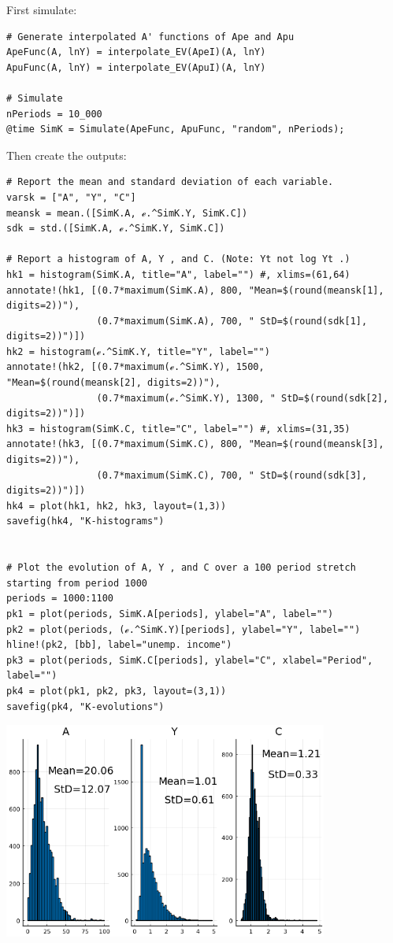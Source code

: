 \documentclass[12pt]{article}
\begin{document}
First simulate:
\begin{lstlisting}[language=JuliaLocal, style=julia]
# Generate interpolated A' functions of Ape and Apu
ApeFunc(A, lnY) = interpolate_EV(ApeI)(A, lnY)
ApuFunc(A, lnY) = interpolate_EV(ApuI)(A, lnY)

# Simulate
nPeriods = 10_000
@time SimK = Simulate(ApeFunc, ApuFunc, "random", nPeriods);
\end{lstlisting}

Then create the outputs:
\begin{lstlisting}[language=JuliaLocal, style=julia]
# Report the mean and standard deviation of each variable. 
varsk = ["A", "Y", "C"]
meansk = mean.([SimK.A, ℯ.^SimK.Y, SimK.C])
sdk = std.([SimK.A, ℯ.^SimK.Y, SimK.C])

# Report a histogram of A, Y , and C. (Note: Yt not log Yt .) 
hk1 = histogram(SimK.A, title="A", label="") #, xlims=(61,64)
annotate!(hk1, [(0.7*maximum(SimK.A), 800, "Mean=$(round(meansk[1], digits=2))"),
                (0.7*maximum(SimK.A), 700, " StD=$(round(sdk[1], digits=2))")])
hk2 = histogram(ℯ.^SimK.Y, title="Y", label="")
annotate!(hk2, [(0.7*maximum(ℯ.^SimK.Y), 1500, "Mean=$(round(meansk[2], digits=2))"),
                (0.7*maximum(ℯ.^SimK.Y), 1300, " StD=$(round(sdk[2], digits=2))")])
hk3 = histogram(SimK.C, title="C", label="") #, xlims=(31,35)
annotate!(hk3, [(0.7*maximum(SimK.C), 800, "Mean=$(round(meansk[3], digits=2))"),
                (0.7*maximum(SimK.C), 700, " StD=$(round(sdk[3], digits=2))")])
hk4 = plot(hk1, hk2, hk3, layout=(1,3))
savefig(hk4, "K-histograms")


# Plot the evolution of A, Y , and C over a 100 period stretch starting from period 1000
periods = 1000:1100
pk1 = plot(periods, SimK.A[periods], ylabel="A", label="")
pk2 = plot(periods, (ℯ.^SimK.Y)[periods], ylabel="Y", label="")
hline!(pk2, [bb], label="unemp. income")
pk3 = plot(periods, SimK.C[periods], ylabel="C", xlabel="Period", label="")
pk4 = plot(pk1, pk2, pk3, layout=(3,1))
savefig(pk4, "K-evolutions")
\end{lstlisting}


\includegraphics[width=0.8\textwidth]{problem sets/ps9/K-histograms.png}
\end{document}
